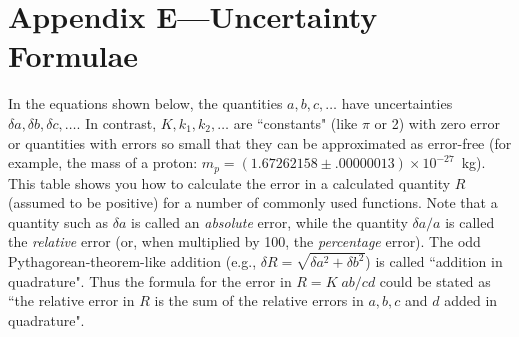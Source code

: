 \newapp
\section*{Appendix E---Uncertainty Formulae}
\markboth {} {}
In the equations shown below, the quantities
$a,b,c,\ldots$ have uncertainties $\delta a,\delta b,\delta c,\ldots.$ 
In contrast, %
$K, k_1,k_2,\ldots$ are ``constants" (like $\pi$ or 2) with
zero error or quantities with  errors so small that they can be approximated 
as error-free (for example, the mass of a proton: $m_p=(1.67262158\pm.00000013)\times 10^{-27}$~kg).
This table shows you how to calculate the error in a calculated quantity $R$ (assumed to be positive) for a number of commonly used functions.  
Note that a quantity such as
$\delta a$ is called an {\em absolute} error, while the quantity
$\delta a/a$ is called the {\em relative} error (or, when multiplied by
100, the {\em percentage} error).  The odd Pythagorean-theorem-like addition
(e.g., $\delta R= \sqrt{\delta a^2 + \delta b^2}$) is called ``addition in
quadrature".  Thus the formula for the error in $R=K\;{ab/cd}$ could be stated as
``the relative error in $R$ is the sum of the relative errors in $a,b,c$ and $d$ added
in quadrature".\label{eq:E.error}

